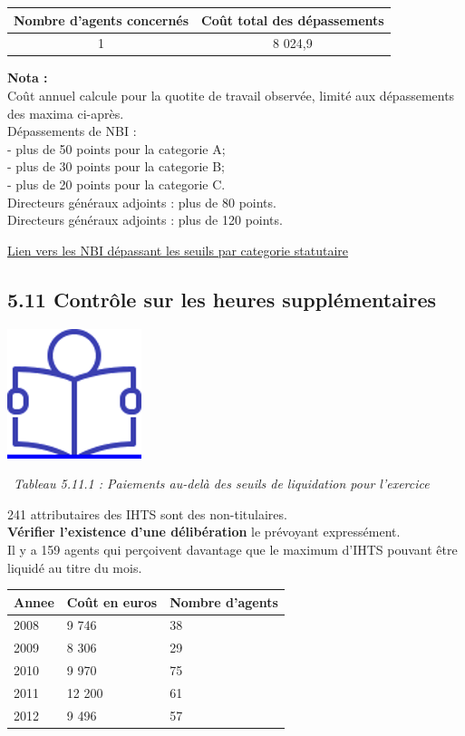 \begin{longtable}[]{@{}cc@{}}
\toprule
Nombre d'agents concernés & Coût total des dépassements\tabularnewline
\midrule
\endhead
1 & 8 024,9\tabularnewline
\bottomrule
\end{longtable}

\textbf{Nota :}\\
Coût annuel calcule pour la quotite de travail observée, limité aux
dépassements des maxima ci-après.\\
Dépassements de NBI :\\
- plus de 50 points pour la categorie A;\\
- plus de 30 points pour la categorie B;\\
- plus de 20 points pour la categorie C.\\
Directeurs généraux adjoints : plus de 80 points.\\
Directeurs généraux adjoints : plus de 120 points.

\href{../Bases/Reglementation/NBI.cat.irreg.csv}{Lien vers les NBI
dépassant les seuils par categorie statutaire}

\hypertarget{controle-sur-les-heures-supplementaires}{%
\subsection{5.11 Contrôle sur les heures
supplémentaires}\label{controle-sur-les-heures-supplementaires}}

\href{../Docs/Notices/fiche_IHTS.odt}{\includegraphics{icones/Notice.png}}

~\emph{Tableau 5.11.1 : Paiements au-delà des seuils de liquidation pour
l'exercice}

241 attributaires des IHTS sont des non-titulaires.\\
\textbf{Vérifier l'existence d'une délibération} le prévoyant
expressément.\\
Il y a 159 agents qui perçoivent davantage que le maximum d'IHTS pouvant
être liquidé au titre du mois.

\begin{longtable}[]{@{}lll@{}}
\toprule
Annee & Coût en euros & Nombre d'agents\tabularnewline
\midrule
\endhead
2008 & 9 746 & 38\tabularnewline
2009 & 8 306 & 29\tabularnewline
2010 & 9 970 & 75\tabularnewline
2011 & 12 200 & 61\tabularnewline
2012 & 9 496 & 57\tabularnewline
\bottomrule
\end{longtable}

